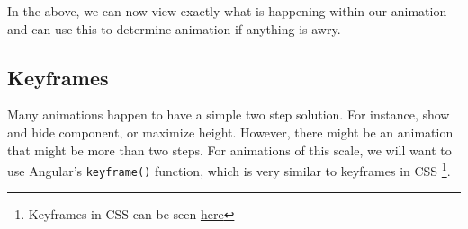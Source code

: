 In the above, we can now view exactly what is happening within our animation 
and can use this to determine animation if anything is awry. 

\subsection{ Keyframes }
Many animations happen to have a simple two step solution. For instance, show 
and hide component, or maximize height. However, there might be an animation 
that might be more than two steps. For animations of this scale, we will want
to use Angular's \lstinline{keyframe()} function, which is very similar to 
keyframes in CSS \footnote{Keyframes in CSS can be seen 
\href{https://www.w3schools.com/cssref/css3_pr_animation-keyframes.asp.}{here}}.
